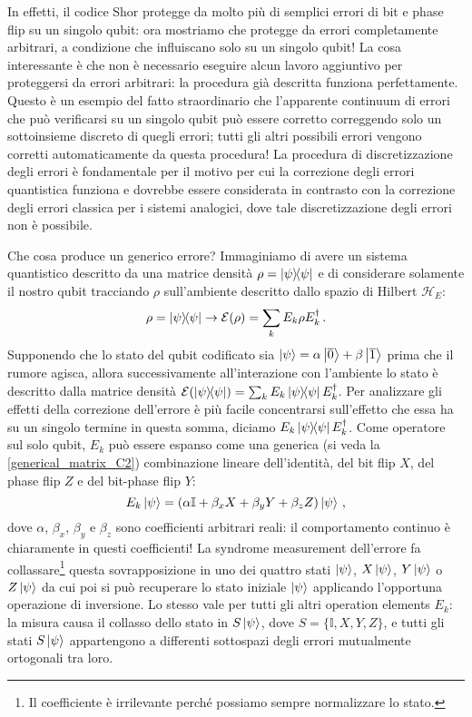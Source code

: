 \noindent In effetti, il codice Shor protegge da molto più di semplici errori di bit e phase flip su un singolo qubit: ora mostriamo che protegge da errori completamente arbitrari, a condizione che influiscano solo su un singolo qubit! La cosa interessante è che non è necessario eseguire alcun lavoro aggiuntivo per proteggersi da errori arbitrari: la procedura già descritta funziona perfettamente. Questo è un esempio del fatto straordinario che l'apparente continuum di errori che può verificarsi su un singolo qubit può essere corretto correggendo solo un sottoinsieme discreto di quegli errori; tutti gli altri possibili errori vengono corretti automaticamente da questa procedura! La procedura di discretizzazione degli errori è fondamentale per il motivo per cui la correzione degli errori quantistica funziona e dovrebbe essere considerata in contrasto con la correzione degli errori classica per i sistemi analogici, dove tale discretizzazione degli errori non è possibile. 

\noindent Che cosa produce un generico errore? Immaginiamo di avere un sistema quantistico descritto da una matrice densità $\rho=\op{\psi}{\psi}$ e di considerare solamente il nostro qubit tracciando $\rho$ sull'ambiente descritto dallo spazio di Hilbert $\mathcal{H}_E$:
\begin{equation*}
    \rho =\op{\psi}{\psi} \rightarrow \mathcal{E}(\rho) = \sum_k E_k \rho E_k^\dagger \, .
\end{equation*}
Supponendo che lo stato del qubit codificato sia $\ket \psi = \alpha\ket{\overline 0} + \beta\ket{\overline 1}$ prima che il rumore agisca, allora successivamente all'interazione con l'ambiente lo stato è descritto dalla matrice densità $\mathcal{E}(\op{\psi}{\psi}) = \sum_k E_k \op{\psi}{\psi} E_k^\dagger$. Per analizzare gli effetti della correzione dell'errore è più facile concentrarsi sull'effetto che essa ha su un singolo termine in questa somma, diciamo $E_k \op{\psi}{\psi} E_k^\dagger$. Come operatore sul solo qubit, $E_k$ può essere espanso come una generica (si veda la \eqref{generical_matrix_C2}) combinazione lineare dell'identità, del bit flip $X$, del phase flip $Z$ e del bit-phase flip $Y$:
\begin{equation*}
    E_k\ket \psi = \left(\alpha \mathbb{I} +\beta_x X + \beta_y Y + \beta_z Z\right)\ket \psi \, ,
\end{equation*}
dove $\alpha$, $\beta_x$, $\beta_y$ e $\beta_z$ sono coefficienti arbitrari reali: il comportamento continuo è chiaramente in questi coefficienti!
La syndrome measurement dell'errore fa collassare\footnote{Il coefficiente è irrilevante perché possiamo sempre normalizzare lo stato.} questa sovrapposizione in uno dei quattro stati $\ket \psi$, $X\ket\psi$, $Y\ket\psi$ o $Z\ket\psi$ da cui poi si può recuperare lo stato iniziale $\ket{\psi}$ applicando l'opportuna operazione di inversione. Lo stesso vale per tutti gli altri operation elements $E_k$: la misura causa il collasso dello stato in $S\ket{\psi}$, dove $S = \{ \mathbb{I}, X, Y, Z \}$, e tutti gli stati $S\ket{\psi}$ appartengono a differenti sottospazi degli errori mutualmente ortogonali tra loro.

